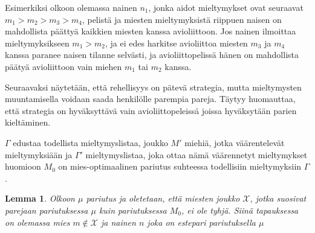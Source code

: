 \documentclass[finnish]{tktltiki2}
\newtheorem{lem}[lau]{Lemma}
\theoremstyle{definition}
\theoremstyle{remark}
\begin{document}
Esimerkiksi olkoon olemassa nainen $n_1$, jonka aidot mieltymykset ovat seuraavat $m_1 > m_2 > m_3 > m_4$, pelistä ja miesten mieltymyksistä riippuen naisen on mahdollista päättyä kaikkien miesten kanssa avioliittoon. Jos nainen ilmoittaa mieltymyksikseen $m_1 > m_2$, ja ei edes harkitse avioliittoa miesten $m_3$ ja $m_4$ kanssa paranee naisen tilanne selvästi, ja avioliittopelissä hänen on mahdollista päätyä avioliittoon vain miehen $m_1$ tai $m_2$ kanssa.

Seuraavaksi näytetään, että rehellisyys on pätevä strategia, mutta mieltymysten muuntamisella voidaan saada henkilölle parempia pareja. Täytyy huomauttaa, että strategia on hyväksyttävä vain avioliittopeleissä joissa hyväksytään parien kieltäminen.

$\Gamma$ edustaa todellista mieltymyslistaa, joukko $M'$ miehiä, jotka väärentelevät mieltymyksiään ja $\Gamma'$ mieltymyslistaa, joka ottaa nämä väärennetyt mieltymykset huomioon $M_0$ on mies-optimaalinen pariutus suhteessa todellisiin mieltymyksiin $\Gamma$. 

\begin{lem}\cite[s. 55]{gusfield1989stable}\label{strategy-blocking}
	Olkoon $\mu$ pariutus ja oletetaan, että miesten joukko $\mathcal{X}$, jotka suosivat parejaan pariutuksessa $\mu$ kuin pariutuksessa $M_0$, ei ole tyhjä. Siinä tapauksessa on olemassa mies $m \notin \mathcal{X}$ ja nainen $n$ joka on estepari pariutuksella $\mu$
\end{lem}
\end{document}
